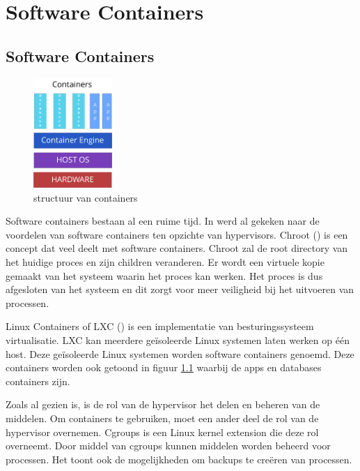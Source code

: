 \chapter{Software Containers}
\label{ch:containers}

\section{Software Containers}

\begin{figure}
    \centering
    \includegraphics[width=3cm]{img/container}
    \caption{structuur van containers}
    \label{fig:containers}
\end{figure}

Software containers bestaan al een ruime tijd. In \cite{soltesz_container-based_2007} werd al gekeken naar de voordelen van software containers ten opzichte van hypervisors. Chroot (\cite{_linux_????}) is een concept dat veel deelt met software containers. Chroot zal de root directory van het huidige proces en zijn children veranderen. Er wordt een virtuele kopie gemaakt van het systeem waarin het proces kan werken. Het proces is dus afgesloten van het systeem en dit zorgt voor meer veiligheid bij het uitvoeren van processen.

Linux Containers of LXC (\cite{containers_linux_????}) is een implementatie van besturingssysteem virtualisatie. LXC kan meerdere geïsoleerde Linux systemen laten werken op één host. Deze geïsoleerde Linux systemen worden software containers genoemd. Deze containers worden ook getoond in figuur \ref{fig:containers} waarbij de apps en databases containers zijn.

Zoals al gezien is, is de rol van de hypervisor het delen en beheren van de middelen. Om containers te gebruiken, moet een ander deel de rol van de hypervisor overnemen. Cgroups is een Linux kernel extension die deze rol overneemt. Door middel van cgroups kunnen middelen worden beheerd voor processen. Het toont ook de mogelijkheden om backups te creëren van processen.

